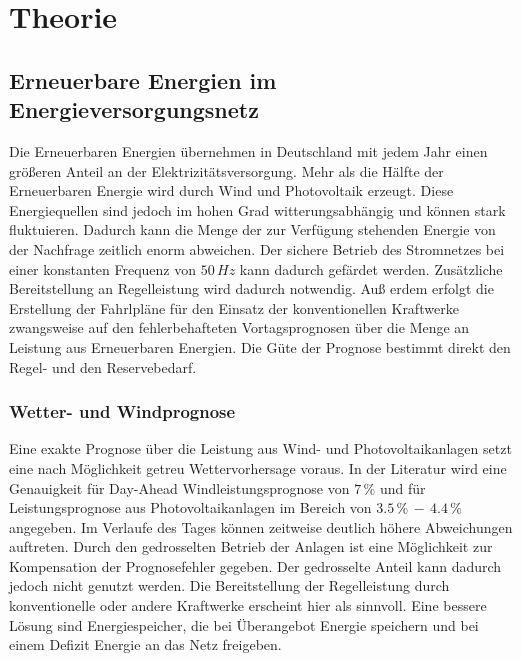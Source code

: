 \chapter{Theorie}
\label{chap:theorie}
\minitoc


\section{Erneuerbare Energien im Energieversorgungsnetz}

Die Erneuerbaren Energien \"ubernehmen in Deutschland mit jedem Jahr einen
gr\"o\ss eren Anteil an der Elektrizit\"atsversorgung. Mehr als die H\"alfte der
Erneuerbaren Energie wird durch Wind und Photovoltaik erzeugt. Diese
Energiequellen sind jedoch im hohen Grad witterungsabh\"angig und k\"onnen stark
fluktuieren. Dadurch kann die Menge der zur Verf\"ugung stehenden Energie von
der Nachfrage zeitlich enorm abweichen. Der sichere Betrieb des Stromnetzes bei
einer konstanten Frequenz von $50\,Hz$ kann dadurch gef\"ardet werden.
Zus\"atzliche Bereitstellung an Regelleistung wird dadurch notwendig. Au\ss
erdem erfolgt die Erstellung der Fahrlpl\"ane f\"ur den Einsatz der
konventionellen Kraftwerke zwangsweise auf den fehlerbehafteten Vortagsprognosen
\"uber die Menge an Leistung aus Erneuerbaren Energien.  Die G\"ute der Prognose
bestimmt direkt den Regel- und den Reservebedarf.


\subsection*{Wetter- und Windprognose}

Eine exakte Prognose \"uber die Leistung aus Wind- und Photovoltaikanlagen setzt
eine nach M\"oglichkeit getreu Wettervorhersage voraus. In der Literatur wird
eine Genauigkeit f\"ur Day-Ahead Windleistungsprognose von $7\,\%$
\cite{prognose_doctor} und f\"ur Leistungsprognose aus Photovoltaikanlagen im
Bereich von $3.5\,\%\,-\,4.4\,\%$ \cite{solarvorhersagung} angegeben. Im
Verlaufe des Tages k\"onnen zeitweise deutlich h\"ohere Abweichungen auftreten.
Durch den gedrosselten Betrieb der Anlagen ist eine M\"oglichkeit zur
Kompensation der Prognosefehler gegeben. Der gedrosselte Anteil kann dadurch
jedoch nicht genutzt werden. Die Bereitstellung der Regelleistung durch
konventionelle oder andere Kraftwerke erscheint hier als sinnvoll. Eine bessere
L\"osung sind Energiespeicher, die bei \"Uberangebot Energie speichern und bei
einem Defizit Energie an das Netz freigeben.

